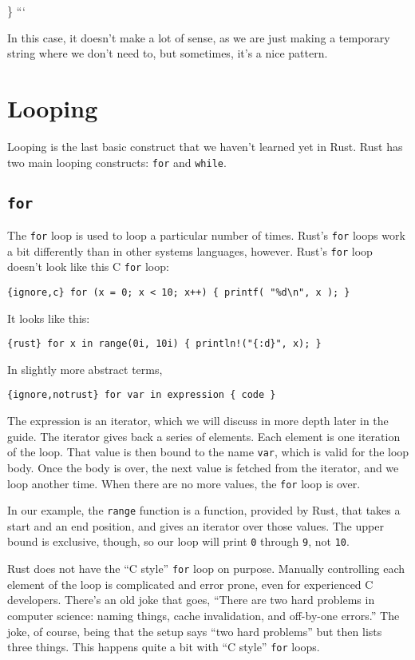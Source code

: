 \documentclass[]{article}
\begin{document}
\} ```

In this case, it doesn't make a lot of sense, as we are just making a
temporary string where we don't need to, but sometimes, it's a nice
pattern.

\section{Looping}\label{looping}

Looping is the last basic construct that we haven't learned yet in Rust.
Rust has two main looping constructs: \texttt{for} and \texttt{while}.

\subsection{\texttt{for}}\label{for}

The \texttt{for} loop is used to loop a particular number of times.
Rust's \texttt{for} loops work a bit differently than in other systems
languages, however. Rust's \texttt{for} loop doesn't look like this C
\texttt{for} loop:

\texttt{\{ignore,c\} for (x = 0; x \textless{} 10; x++) \{     printf( "\%d\textbackslash{}n", x ); \}}

It looks like this:

\texttt{\{rust\} for x in range(0i, 10i) \{     println!("\{:d\}", x); \}}

In slightly more abstract terms,

\texttt{\{ignore,notrust\} for var in expression \{     code \}}

The expression is an iterator, which we will discuss in more depth later
in the guide. The iterator gives back a series of elements. Each element
is one iteration of the loop. That value is then bound to the name
\texttt{var}, which is valid for the loop body. Once the body is over,
the next value is fetched from the iterator, and we loop another time.
When there are no more values, the \texttt{for} loop is over.

In our example, the \texttt{range} function is a function, provided by
Rust, that takes a start and an end position, and gives an iterator over
those values. The upper bound is exclusive, though, so our loop will
print \texttt{0} through \texttt{9}, not \texttt{10}.

Rust does not have the ``C style'' \texttt{for} loop on purpose.
Manually controlling each element of the loop is complicated and error
prone, even for experienced C developers. There's an old joke that goes,
``There are two hard problems in computer science: naming things, cache
invalidation, and off-by-one errors.'' The joke, of course, being that
the setup says ``two hard problems'' but then lists three things. This
happens quite a bit with ``C style'' \texttt{for} loops.
\end{document}
